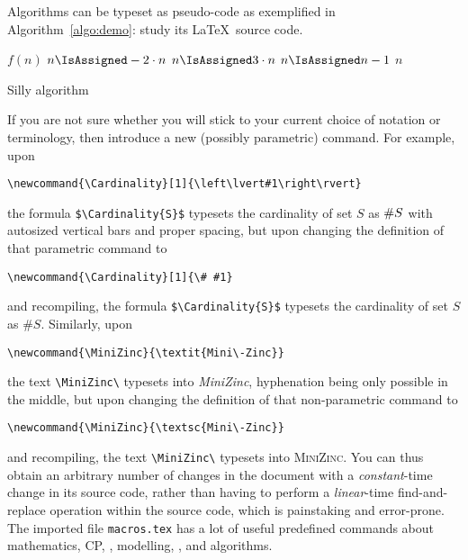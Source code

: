 Algorithms can be typeset as pseudo-code as exemplified in
Algorithm~\ref{algo:demo}: study its \LaTeX\ source code.

\begin{algorithm}[b]
  \begin{algorithmic}[1]  %
    \STATE \Function $f(n)$
      \STATE $n \IsAssigned -2 \cdot n$ 
    \ELSE[$n \geq 0$]
      \STATE $n \IsAssigned  3 \cdot n$
    \ENDIF
      \STATE $n \IsAssigned n-1$
    \ENDWHILE
    \RETURN $n$
  \end{algorithmic}
  \caption{Silly algorithm}
  \label{algo:demo}
\end{algorithm}

If you are not sure whether you will stick to your current choice of
notation or terminology, then introduce a new (possibly parametric)
command.  For example, upon
\begin{center}
  \verb|\newcommand{\Cardinality}[1]{\left\lvert#1\right\rvert}|
\end{center}
the formula \verb|$\Cardinality{S}$| typesets the cardinality of set
$S$ as $\Cardinality{S}$ with autosized vertical bars and proper
spacing, but upon changing the definition of that parametric command
to
\begin{center}
  \verb|\newcommand{\Cardinality}[1]{\# #1}|
\end{center}
and recompiling, the formula \verb|$\Cardinality{S}$| typesets the
cardinality of set $S$ as $\#S$.
%
Similarly, upon
\begin{center}
  \verb|\newcommand{\MiniZinc}{\textit{Mini\-Zinc}}|
\end{center}
the text \verb|\MiniZinc\| typesets into \textit{MiniZinc},
hyphenation being only possible in the middle, but upon changing the
definition of that non-parametric command to
\begin{center}
  \verb|\newcommand{\MiniZinc}{\textsc{Mini\-Zinc}}|
\end{center}
and recompiling, the text \verb|\MiniZinc\| typesets into
\textsc{MiniZinc}.
%
You can thus obtain an arbitrary number of changes in the document
with a \emph{constant}-time change in its source code, rather than
having to perform a \emph{linear}-time find-and-replace operation
within the source code, which is painstaking and error-prone.  The
imported file \texttt{macros.tex} has a lot of useful predefined
commands about mathematics, CP, \Gecode, modelling, \MiniZinc, and
algorithms.

